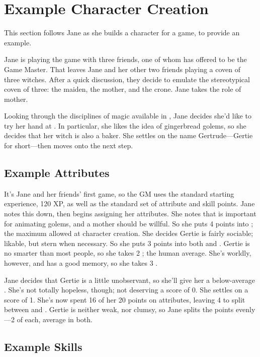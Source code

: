 \section{Example Character Creation}

This section follows Jane as she builds a character for a game, to provide an example.

Jane is playing the game with three friends, one of whom has offered to be the Game Master.
That leaves Jane and her other two friends playing a coven of three witches.
After a quick discussion, they decide to emulate the stereotypical coven of three: the maiden, the mother, and the crone.
Jane takes the role of mother.

Looking through the disciplines of magic available in , Jane decides she'd like to try her hand at .
In particular, she likes the idea of gingerbread golems, so she decides that her witch is also a baker.
She settles on the name Gertrude---Gertie for short---then moves onto the next step.

\subsection{Example Attributes}

It's Jane and her friends' first game, so the GM uses the standard starting experience, 120 XP, as well as the standard set of attribute and skill points.
Jane notes this down, then begins assigning her attributes.
She notes that  is important for animating golems, and a mother should be willful.
So she puts 4 points into ; the maximum allowed at character creation.
She decides Gertie is fairly sociable; likable, but stern when necessary.
So she puts 3 points into both  and .
Gertie is no smarter than most people, so she takes 2 ; the human average.
She's worldly, however, and has a good memory, so she takes 3 .

Jane decides that Gertie is a little unobservant, so she'll give her a below-average .
She's not totally hopeless, though; not deserving a score of 0.
She settles on a score of 1.
She's now spent 16 of her 20 points on attributes, leaving 4 to split between  and .
Gertie is neither weak, nor clumsy, so Jane splits the points evenly---2 of each, average in both.


\subsection{Example Skills}

